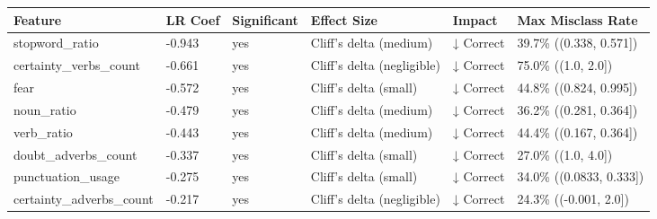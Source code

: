 \begin{tabular}{llllll}
\toprule
Feature & LR Coef & Significant & Effect Size & Impact & Max Misclass Rate \\
\midrule
stopword\_ratio & -0.943 & yes & Cliff's delta (medium) & ↓ Correct & 39.7\% ((0.338, 0.571]) \\
certainty\_verbs\_count & -0.661 & yes & Cliff's delta (negligible) & ↓ Correct & 75.0\% ((1.0, 2.0]) \\
fear & -0.572 & yes & Cliff's delta (small) & ↓ Correct & 44.8\% ((0.824, 0.995]) \\
noun\_ratio & -0.479 & yes & Cliff's delta (medium) & ↓ Correct & 36.2\% ((0.281, 0.364]) \\
verb\_ratio & -0.443 & yes & Cliff's delta (medium) & ↓ Correct & 44.4\% ((0.167, 0.364]) \\
doubt\_adverbs\_count & -0.337 & yes & Cliff's delta (small) & ↓ Correct & 27.0\% ((1.0, 4.0]) \\
punctuation\_usage & -0.275 & yes & Cliff's delta (small) & ↓ Correct & 34.0\% ((0.0833, 0.333]) \\
certainty\_adverbs\_count & -0.217 & yes & Cliff's delta (negligible) & ↓ Correct & 24.3\% ((-0.001, 2.0]) \\
\bottomrule
\end{tabular}
